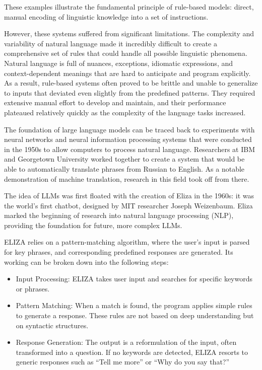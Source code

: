 These examples illustrate the fundamental principle of rule-based models: direct, manual encoding of linguistic knowledge into a set of instructions.

However, these systems suffered from significant limitations. The complexity and variability of natural language made it incredibly difficult to create a comprehensive set of rules that could handle all possible linguistic phenomena. Natural language is full of nuances, exceptions, idiomatic expressions, and context-dependent meanings that are hard to anticipate and program explicitly. As a result, rule-based systems often proved to be brittle and unable to generalize to inputs that deviated even slightly from the predefined patterns. They required extensive manual effort to develop and maintain, and their performance plateaued relatively quickly as the complexity of the language tasks increased.

The foundation of large language models can be traced back to experiments with neural networks and neural information processing systems that were conducted in the 1950s to allow computers to process natural language. Researchers at IBM and Georgetown University worked together to create a system that would be able to automatically translate phrases from Russian to English. As a notable demonstration of machine translation, research in this field took off from there.

The idea of LLMs was first floated with the creation of Eliza in the 1960s: it was the world’s first chatbot, designed by MIT researcher Joseph Weizenbaum. Eliza marked the beginning of research into natural language processing (NLP), providing the foundation for future, more complex LLMs.

ELIZA relies on a pattern-matching algorithm, where the user’s input is parsed for key phrases, and corresponding predefined responses are generated. Its working can be broken down into the following steps:

\begin{itemize}
    \item Input Processing: ELIZA takes user input and searches for specific keywords or phrases.
    \item Pattern Matching: When a match is found, the program applies simple rules to generate a response. These rules are not based on deep understanding but on syntactic structures.
    \item Response Generation: The output is a reformulation of the input, often transformed into a question. If no keywords are detected, ELIZA resorts to generic responses such as “Tell me more” or “Why do you say that?”
\end{itemize}

